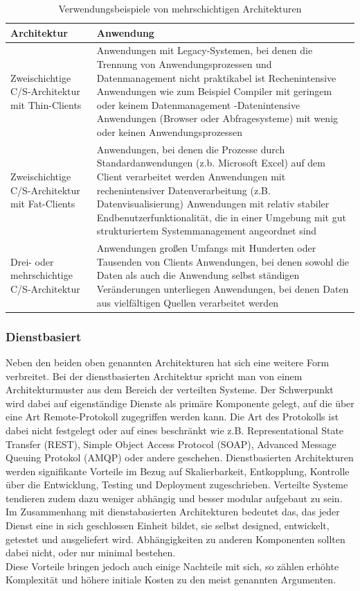 	\begin{table}[h]
	\begin{tabular}{|p{3.5cm}|p{12.5cm}|}
		\hline 
		\textbf{Architektur} & \textbf{Anwendung} \\ 
		\hline 
		Zweischichtige C/S-Architektur mit Thin-Clients & Anwendungen mit Legacy-Systemen, bei denen die Trennung von Anwendungsprozessen und Datenmanagement nicht praktikabel ist Rechenintensive Anwendungen wie zum Beispiel Compiler mit geringem oder keinem Datenmanagement -Datenintensive Anwendungen (Browser oder Abfragesysteme) mit wenig oder keinen Anwendungsprozessen \\
		\hline 
		Zweischichtige C/S-Architektur mit Fat-Clients & Anwendungen, bei denen die Prozesse durch Standardanwendungen (z.b. Microsoft Excel) auf dem Client verarbeitet werden Anwendungen mit rechenintensiver Datenverarbeitung (z.B. Datenvisualisierung) Anwendungen mit relativ stabiler Endbenutzerfunktionalität, die in einer Umgebung mit gut strukturiertem Systemmanagement angeordnet sind \\ 
		\hline 
		Drei- oder mehrschichtige C/S-Architektur & Anwendungen großen Umfangs mit Hunderten oder Tausenden von Clients Anwendungen, bei denen sowohl die Daten als auch die Anwendung selbst ständigen Veränderungen unterliegen Anwendungen, bei denen Daten aus vielfältigen Quellen verarbeitet werden \\ 
		\hline 
	\end{tabular} 
			\caption{Verwendungsbeispiele von mehrschichtigen Architekturen \cite{Sommerville.2007}}
	\end{table}
	
	
	\subsubsection{Dienstbasiert}
	Neben den beiden oben genannten Architekturen hat sich eine weitere Form verbreitet. Bei der dienstbasierten Architektur spricht man von einem Architekturmuster aus dem Bereich der verteilten Systeme. Der Schwerpunkt wird dabei auf eigenständige Dienste als primäre Komponente gelegt, auf die über eine Art Remote-Protokoll zugegriffen werden kann. Die Art des Protokolls ist dabei nicht festgelegt oder auf eines beschränkt wie z.B. Representational State Transfer (REST), Simple Object Access Protocol (SOAP), Advanced Message Queuing Protokol (AMQP) oder andere geschehen.
	Dienstbasierten Architekturen werden signifikante Vorteile im Bezug auf Skalierbarkeit, Entkopplung, Kontrolle über die Entwicklung, Testing und Deployment zugeschrieben. Verteilte Systeme tendieren zudem dazu weniger abhängig und besser modular aufgebaut zu sein. Im Zusammenhang mit dienstabasierten Architekturen bedeutet das, das jeder Dienst eine in sich geschlossen Einheit bildet, sie selbst designed, entwickelt, getestet und ausgeliefert wird.  Abhängigkeiten zu anderen Komponenten sollten dabei nicht, oder nur minimal bestehen. \\
	Diese Vorteile bringen jedoch auch einige Nachteile mit sich, so zählen erhöhte Komplexität und höhere initiale Kosten zu den meist genannten Argumenten.
	
